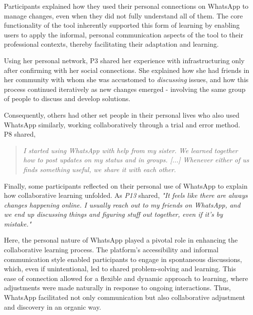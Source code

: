 Participants explained how they used their personal connections on WhatsApp to manage changes, even when they did not fully understand all of them. The core functionality of the tool inherently supported this form of learning by enabling users to apply the informal, personal communication aspects of the tool to their professional contexts, thereby facilitating their adaptation and learning.

Using her personal network, P3 shared her experience with infrastructuring only after confirming with her social connections. She explained how she had friends in her community with whom she was accustomed to \textit{discussing} issues, and how this process continued iteratively as new changes emerged - involving the same group of people to discuss and develop solutions.


Consequently, others had other set people in their personal lives who also used WhatsApp similarly, working collaboratively through a trial and error method. P8 shared,

\begin{quote}
    \textit{I started using WhatsApp with help from my sister. We learned together how to post updates on my status and in groups. [...] Whenever either of us finds something useful, we share it with each other.}
\end{quote}

Finally, some participants reflected on their personal use of WhatsApp to explain how collaborative learning unfolded. As \textit{P13} shared, \textit{"It feels like there are always changes happening online. I usually reach out to my friends on WhatsApp, and we end up discussing things and figuring stuff out together, even if it’s by mistake."}

Here, the personal nature of WhatsApp played a pivotal role in enhancing the collaborative learning process. The platform's accessibility and informal communication style enabled participants to engage in spontaneous discussions, which, even if unintentional, led to shared problem-solving and learning. This ease of connection allowed for a flexible and dynamic approach to learning, where adjustments were made naturally in response to ongoing interactions. Thus, WhatsApp facilitated not only communication but also collaborative adjustment and discovery in an organic way.

